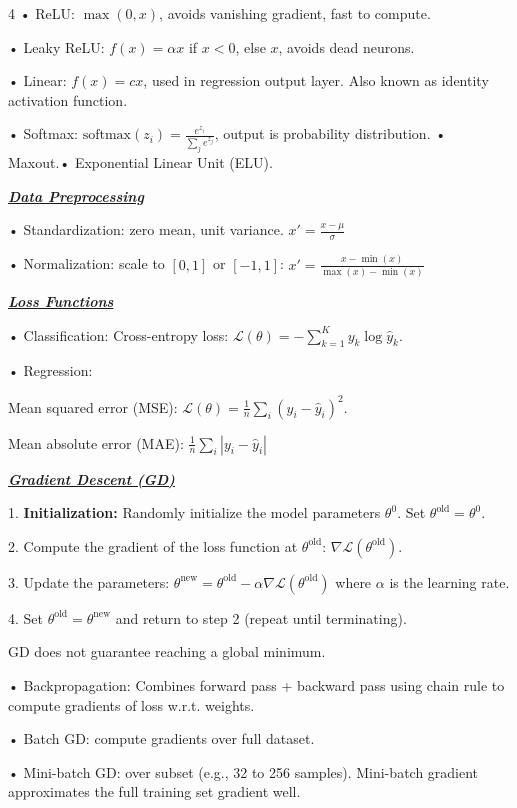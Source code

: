 \documentclass[10pt]{article}
\newcommand{\bulletPoint}[1]{\ul{\textit{\textbf{#1}}}}
\begin{document}
\begin{multicols*}{4}
• ReLU: $\max(0, x)$, avoids vanishing gradient, fast to compute. \quad

• Leaky ReLU: $f(x) = \alpha x$ if $x < 0$, else $x$, avoids dead neurons. \quad

• Linear: $f(x) = cx$, used in regression output layer. 
Also known as identity activation function.

• Softmax: $\text{softmax}(z_i) = \frac{e^{z_i}}{\sum_j e^{z_j}}$, output is probability distribution.\quad
• Maxout.\quad • Exponential Linear Unit (ELU). 

\bulletPoint{Data Preprocessing} \quad

• Standardization: zero mean, unit variance. \quad
$x' = \frac{x - \mu}{\sigma}$ \quad

• Normalization: scale to $[0, 1]$ or $[-1, 1]$: $x' = \frac{x - \min(x)}{\max(x) - \min(x)}$

\bulletPoint{Loss Functions} \quad

• Classification: Cross-entropy loss: 
$\mathcal{L}(\theta) = -\sum_{k=1}^K y_k \log \hat{y}_k$. 

• Regression: 

Mean squared error (MSE): $\mathcal{L}(\theta) = \frac{1}{n} \sum_i (y_i - \hat{y}_i)^2$. 

Mean absolute error (MAE): $\frac{1}{n} \sum_i |y_i - \hat{y}_i|$

\bulletPoint{Gradient Descent (GD)} \quad

1. \textbf{Initialization:} Randomly initialize the model parameters $\theta^0$. Set $\theta^{\text{old}} = \theta^0$.

2. Compute the gradient of the loss function at $\theta^{\text{old}}$: $\nabla \mathcal{L}(\theta^{\text{old}})$.

3. Update the parameters:
$\theta^{\text{new}} = \theta^{\text{old}} - \alpha \nabla \mathcal{L}(\theta^{\text{old}})$
where $\alpha$ is the learning rate.

4. Set $\theta^{\text{old}} = \theta^{\text{new}}$ and return to step 2 (repeat until terminating).

GD does not guarantee reaching a global minimum.

• Backpropagation: Combines forward pass + backward pass using chain rule to compute gradients of loss w.r.t. weights. 

• Batch GD: compute gradients over full dataset. 

• Mini-batch GD: over subset (e.g., 32 to 256 samples). Mini-batch gradient approximates the full training set gradient well.


\end{multicols*}
\end{document}
